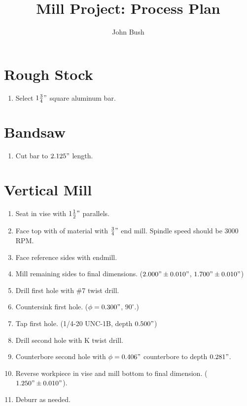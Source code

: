 \documentclass{article}
\begin{document}
\title{Mill Project: Process Plan}
\author{John Bush}

\maketitle

\section*{Rough Stock}

\begin{enumerate}
	\item Select $1 \frac{3}{4}"$ square aluminum bar.
\end{enumerate}

\section*{Bandsaw}

\begin{enumerate}[resume]
	\item Cut bar to $2.125"$ length.
\end{enumerate}

\section*{Vertical Mill}

\begin{enumerate}[resume]
	\item Seat in vise with $1 \frac{1}{2}"$ parallels.

	\item Face top with of material with $\frac{3}{4}"$ end mill.  Spindle speed should be 3000 RPM.

	\item Face reference sides with endmill.

	\item Mill remaining sides to final dimensions. ($2.000" \pm 0.010"$, $1.700" \pm 0.010"$)

	\item Drill first hole with \#7 twist drill.

	\item Countersink first hole. ($\phi = 0.300"$, $90^{\circ}$.)

	\item Tap first hole. (1/4-20 UNC-1B, depth $0.500"$)

	\item Drill second hole with K twist drill.

	\item Counterbore second hole with $\phi = 0.406"$ counterbore to depth $0.281"$.

	\item Reverse workpiece in vise and mill bottom to final dimension. ($1.250" \pm 0.010"$).

	\item Deburr as needed.

\end{enumerate}
\end{document}
